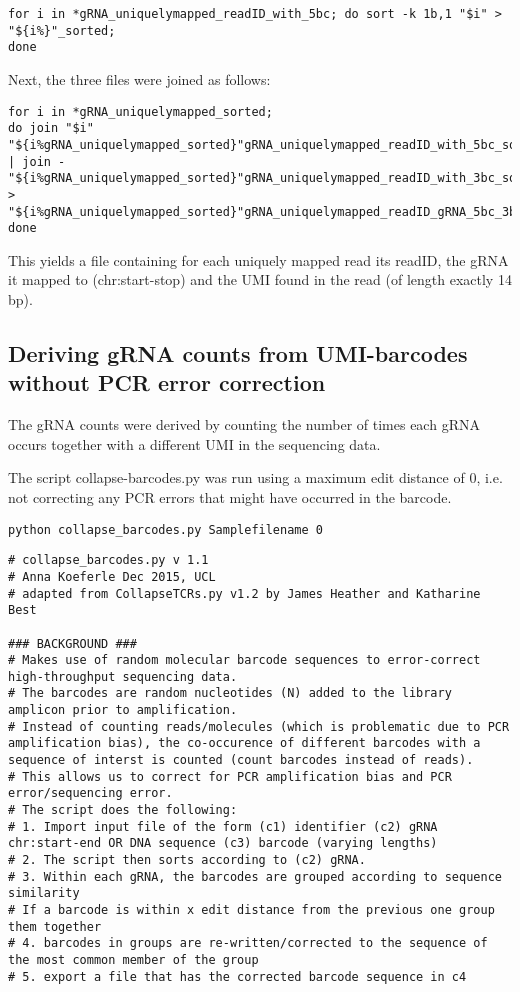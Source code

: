\begin{footnotesize}
\begin{lstlisting}
for i in *gRNA_uniquelymapped_readID_with_5bc; do sort -k 1b,1 "$i" > "${i%}"_sorted;
done
\end{lstlisting}

Next, the three files were joined as follows:

\begin{lstlisting}
for i in *gRNA_uniquelymapped_sorted;
do join "$i" "${i%gRNA_uniquelymapped_sorted}"gRNA_uniquelymapped_readID_with_5bc_sorted | join - "${i%gRNA_uniquelymapped_sorted}"gRNA_uniquelymapped_readID_with_3bc_sorted > "${i%gRNA_uniquelymapped_sorted}"gRNA_uniquelymapped_readID_gRNA_5bc_3bc_length14;
done
\end{lstlisting}

This yields a file containing for each uniquely mapped read its readID, the gRNA it mapped to (chr:start-stop) and the UMI found in the read (of length exactly 14 bp).



\subsection{Deriving gRNA counts from UMI-barcodes without PCR error correction}

The gRNA counts were derived by counting the number of times each gRNA occurs together with a different UMI in the sequencing data.

The script collapse-barcodes.py was run using a maximum edit distance of 0, i.e. not correcting any PCR errors that might have occurred in the barcode.

\begin{lstlisting}
python collapse_barcodes.py Samplefilename 0
\end{lstlisting}


\begin{lstlisting}
# collapse_barcodes.py v 1.1
# Anna Koeferle Dec 2015, UCL
# adapted from CollapseTCRs.py v1.2 by James Heather and Katharine Best

### BACKGROUND ###
# Makes use of random molecular barcode sequences to error-correct high-throughput sequencing data.
# The barcodes are random nucleotides (N) added to the library amplicon prior to amplification.
# Instead of counting reads/molecules (which is problematic due to PCR amplification bias), the co-occurence of different barcodes with a sequence of interst is counted (count barcodes instead of reads).
# This allows us to correct for PCR amplification bias and PCR error/sequencing error.
# The script does the following:
# 1. Import input file of the form (c1) identifier (c2) gRNA chr:start-end OR DNA sequence (c3) barcode (varying lengths)
# 2. The script then sorts according to (c2) gRNA.
# 3. Within each gRNA, the barcodes are grouped according to sequence similarity
# If a barcode is within x edit distance from the previous one group them together
# 4. barcodes in groups are re-written/corrected to the sequence of the most common member of the group
# 5. export a file that has the corrected barcode sequence in c4


\end{lstlisting}
\end{footnotesize}
